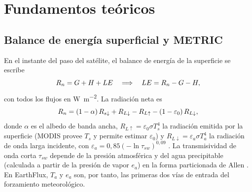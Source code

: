 \section{Fundamentos teóricos}\label{sec:theory}

\subsection{Balance de energía superficial y METRIC}

En el instante del paso del satélite, el balance de energía de la superficie
se escribe
\begin{equation}
  R_n = G + H + LE \quad\Longrightarrow\quad LE = R_n - G - H,
  \label{eq:balance}
\end{equation}
con todos los flujos en \si{\watt\per\square\metre}. La radiación neta es
\begin{equation}
  R_n = (1-\alpha)\,R_{s\downarrow} + R_{L\downarrow} - R_{L\uparrow}
        - (1-\varepsilon_0)\,R_{L\downarrow},
  \label{eq:rn}
\end{equation}
donde $\alpha$ es el albedo de banda ancha, $R_{L\uparrow} =
\varepsilon_0\sigma T_s^4$ la radiación emitida por la superficie (MODIS
provee $T_s$ y permite estimar $\varepsilon_0$) y $R_{L\downarrow} =
\varepsilon_a\sigma T_a^4$ la radiación de onda larga incidente, con
$\varepsilon_a = 0{,}85(-\ln\tau_{sw})^{0{,}09}$ \parencite{waters2002sebal}.
La transmisividad de onda corta $\tau_{sw}$ depende de la presión
atmosférica y del agua precipitable (calculada a partir de la presión de
vapor $e_a$) en la forma particionada de Allen \parencite{asce2005standardized}.
En EarthFlux, $T_a$ y $e_a$ son, por tanto, las primeras dos vías de entrada
del forzamiento meteorológico.

